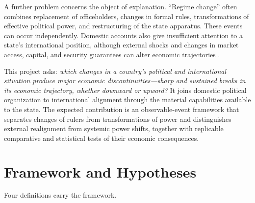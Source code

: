 \documentclass[11pt]{article}
\begin{document}
A further problem concerns the object of explanation. ``Regime change'' often combines replacement of officeholders, changes in formal rules, transformations of effective political power, and restructuring of the state apparatus. These events can occur independently. Domestic accounts also give insufficient attention to a state's international position, although external shocks and changes in market access, capital, and security guarantees can alter economic trajectories \parencite{rodrik_1999,lake_2009}.

This project asks: \emph{which changes in a country's political and international situation produce major economic discontinuities---sharp and sustained breaks in its economic trajectory, whether downward or upward?} It joins domestic political organization to international alignment through the material capabilities available to the state. The expected contribution is an observable-event framework that separates changes of rulers from transformations of power and distinguishes external realignment from systemic power shifts, together with replicable comparative and statistical tests of their economic consequences.

\section{Framework and Hypotheses}
\label{sec:framework}

Four definitions carry the framework.
\end{document}
